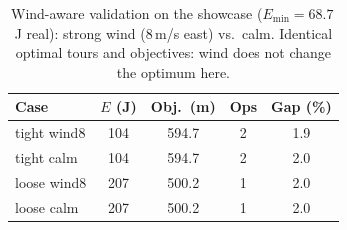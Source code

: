 \begin{table}[t]
\centering
\caption{Wind-aware validation on the showcase ($E_{\min}=68.7$\,J real): strong wind (8\,m/s east) vs.\ calm. Identical optimal tours and objectives: wind does not change the optimum here.}
\label{tab:wind-validation}
\begin{tabular}{lcccc}
\toprule
Case & $E$ (J) & Obj.\ (m) & Ops & Gap (\%) \\
\midrule
tight wind8 & 104 & 594.7 & 2 & 1.9 \\
tight calm & 104 & 594.7 & 2 & 2.0 \\
loose wind8 & 207 & 500.2 & 1 & 2.0 \\
loose calm & 207 & 500.2 & 1 & 2.0 \\
\bottomrule
\end{tabular}
\end{table}
